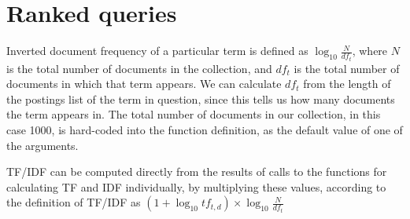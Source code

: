 \documentclass{article}
\begin{document}
\section{Ranked queries}
Inverted document frequency of a particular term is defined as $\log_10 \frac{N}{df_t}$, where $N$ is the total number of documents in the collection, and $df_t$ is the total number of documents in which that term appears. We can calculate $df_t$ from the length of the postings list of the term in question, since this tells us how many documents the term appears in. The total number of documents in our collection, in this case 1000, is hard-coded into the function definition, as the default value of one of the arguments. 


TF/IDF can be computed directly from the results of calls to the functions for calculating TF and IDF individually, by multiplying these values, according to the definition of TF/IDF as $(1+ \log_10 tf_{t,d})\times \log_10 \frac{N}{df_t}$


\end{document}
